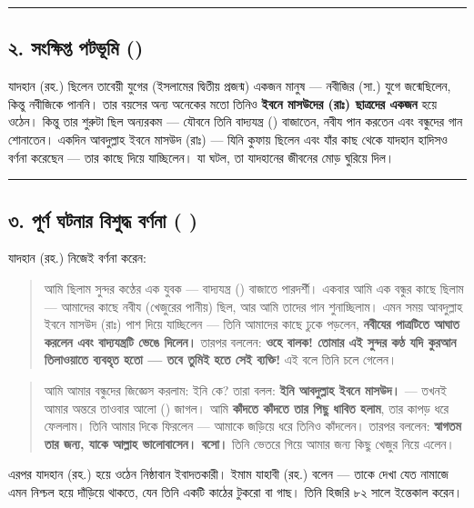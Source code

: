 \medskip\hrule\medskip

\subsection*{২. সংক্ষিপ্ত পটভূমি ()}

যাদহান (রহ.) ছিলেন তাবেয়ী যুগের (ইসলামের দ্বিতীয় প্রজন্ম) একজন মানুষ — নবীজির (সা.) যুগে জন্মেছিলেন, কিন্তু নবীজিকে পাননি। তার বয়সের অন্য অনেকের মতো তিনিও \textbf{ইবনে মাসউদের (রাঃ) ছাত্রদের একজন} হয়ে ওঠেন। কিন্তু তার শুরুটা ছিল অন্যরকম — যৌবনে তিনি বাদ্যযন্ত্র () বাজাতেন, নবীয পান করতেন এবং বন্ধুদের গান শোনাতেন। একদিন আবদুল্লাহ ইবনে মাসউদ (রাঃ) — যিনি কুফায় ছিলেন এবং যাঁর কাছ থেকে যাদহান হাদিসও বর্ণনা করেছেন — তার কাছে দিয়ে যাচ্ছিলেন। যা ঘটল, তা যাদহানের জীবনের মোড় ঘুরিয়ে দিল।

\medskip\hrule\medskip

\subsection*{৩. পূর্ণ ঘটনার বিশুদ্ধ বর্ণনা (  )}

যাদহান (রহ.) নিজেই বর্ণনা করেন:

\begin{quote}
আমি ছিলাম সুন্দর কণ্ঠের এক যুবক — বাদ্যযন্ত্র () বাজাতে পারদর্শী। একবার আমি এক বন্ধুর কাছে ছিলাম — আমাদের কাছে নবীয (খেজুরের পানীয়) ছিল, আর আমি তাদের গান শুনাচ্ছিলাম। এমন সময় আবদুল্লাহ ইবনে মাসউদ (রাঃ) পাশ দিয়ে যাচ্ছিলেন — তিনি আমাদের কাছে ঢুকে পড়লেন, \textbf{নবীযের পাত্রটিতে আঘাত করলেন এবং বাদ্যযন্ত্রটি ভেঙে দিলেন।} তারপর বললেন: \textbf{ওহে বালক! তোমার এই সুন্দর কণ্ঠ যদি কুরআন তিলাওয়াতে ব্যবহৃত হতো — তবে তুমিই হতে সেই ব্যক্তি!} এই বলে তিনি চলে গেলেন।
\end{quote}

\begin{quote}
আমি আমার বন্ধুদের জিজ্ঞেস করলাম: ইনি কে? তারা বলল: \textbf{ইনি আবদুল্লাহ ইবনে মাসউদ।} — তখনই আমার অন্তরে তাওবার আলো () জাগল। আমি \textbf{কাঁদতে কাঁদতে তার পিছু ধাবিত হলাম}, তার কাপড় ধরে ফেললাম। তিনি আমার দিকে ফিরলেন — আমাকে জড়িয়ে ধরে তিনিও কাঁদলেন। তারপর বললেন: \textbf{স্বাগতম তার জন্য, যাকে আল্লাহ ভালোবাসেন। বসো।} তিনি ভেতরে গিয়ে আমার জন্য কিছু খেজুর নিয়ে এলেন।
\end{quote}

এরপর যাদহান (রহ.) হয়ে ওঠেন নিষ্ঠাবান ইবাদতকারী। ইমাম যাহাবী (রহ.) বলেন — তাকে দেখা যেত নামাজে এমন নিশ্চল হয়ে দাঁড়িয়ে থাকতে, যেন তিনি একটি কাঠের টুকরো বা গাছ। তিনি হিজরি ৮২ সালে ইন্তেকাল করেন।

